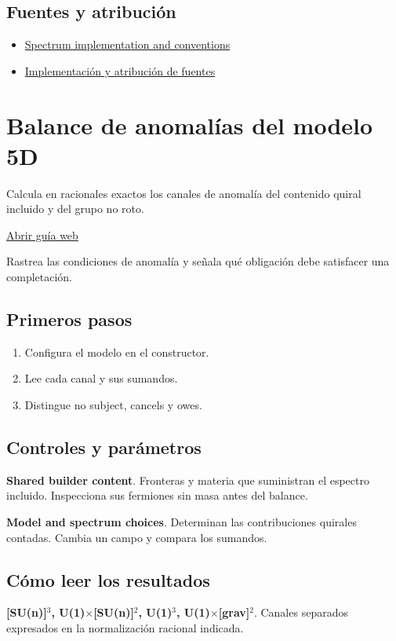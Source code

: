 \documentclass[11pt,a4paper]{article}
\begin{document}
\subsection*{Fuentes y atribución}
\begin{itemize}
\item \href{https://github.com/karlesmarin/ghu-lab/blob/main/src/modules/spectrum5d.mjs}{Spectrum implementation and conventions}
\item \href{https://github.com/karlesmarin/ghu-lab/blob/main/src/sections/spectrum5d_section.js}{Implementación y atribución de fuentes}
\end{itemize}
\section{Balance de anomalías del modelo 5D}
Calcula en racionales exactos los canales de anomalía del contenido quiral incluido y del grupo no roto.

\href{https://karlesmarin.github.io/ghu-explorer/guide/es/anomaly5d/index.html}{Abrir guía web}

Rastrea las condiciones de anomalía y señala qué obligación debe satisfacer una completación.
\subsection*{Primeros pasos}
\begin{enumerate}
\item Configura el modelo en el constructor.
\item Lee cada canal y sus sumandos.
\item Distingue no subject, cancels y owes.
\end{enumerate}
\subsection*{Controles y parámetros}
\textbf{Shared builder content}. Fronteras y materia que suministran el espectro incluido. Inspecciona sus fermiones sin masa antes del balance.

\textbf{Model and spectrum choices}. Determinan las contribuciones quirales contadas. Cambia un campo y compara los sumandos.

\subsection*{Cómo leer los resultados}
\textbf{[SU(n)]\ensuremath{{}^{3}}, U(1)\ensuremath{\times}[SU(n)]\ensuremath{{}^{2}}, U(1)\ensuremath{{}^{3}}, U(1)\ensuremath{\times}[grav]\ensuremath{{}^{2}}}. Canales separados expresados en la normalización racional indicada.
\end{document}
